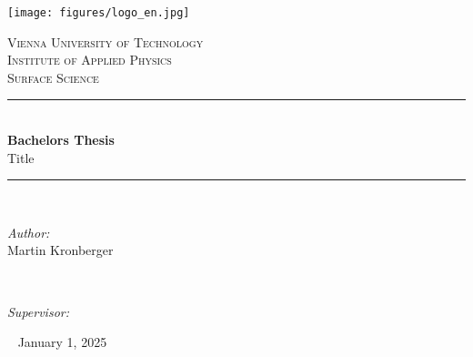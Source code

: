 \thispagestyle{empty}

\newcommand{\HRule}{\rule{\linewidth}{0.5mm}} %

\texttt{[image: figures/logo\_en.jpg]}
\vspace{3cm}

\begin{center} %

\textsc{\LARGE Vienna University of Technology}\\[1cm] 
\textsc{\Large Institute of Applied Physics}\\[1cm]
\textsc{\large Surface Science}\\[3cm]

\HRule \\[0.4cm]
{\Huge \bfseries Bachelors Thesis}\\[0.5cm] %
{\Large Title}
\HRule \\[2cm]


\begin{minipage}{0.4\textwidth}
\begin{flushleft} \large
	\emph{Author:}\\
	Martin Kronberger\\
	\end{flushleft}
	\end{minipage}
~
\begin{minipage}{0.5\textwidth}
\begin{flushright} \large
	\emph{Supervisor:} \\
\end{flushright}
\end{minipage}\
\vspace{1cm}
\makeatletter
\vspace{1cm}
{\large January 1, 2025}
\end{center}
